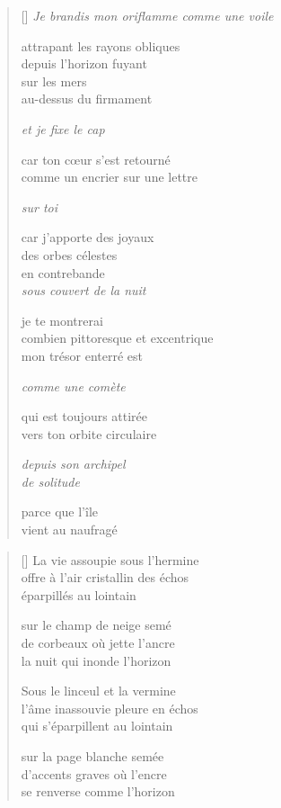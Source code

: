 \documentclass[12pt,a4paper]{article}
\begin{document}
\begin{verse}[\versewidth]
  \emph{Je brandis mon oriflamme comme une voile}

  attrapant les rayons obliques \\
  depuis l'horizon fuyant \\
  sur les mers \\
  au-dessus du firmament

  \emph{et je fixe le cap}

  car ton cœur s'est retourné \\
  comme un encrier sur une lettre

  \emph{sur toi}

  car j'apporte des joyaux \\
  des orbes célestes \\
  en contrebande \\

  \emph{sous couvert de la nuit}

  je te montrerai \\
  combien pittoresque et excentrique \\
  mon trésor enterré est

  \emph{comme une comète}

  qui est toujours attirée \\
  vers ton orbite circulaire

  \emph{depuis son archipel \\
  de solitude}

  parce que l'île \\
  vient au naufragé
\end{verse}


\newpage

\poemtitle{}

\settowidth{\versewidth}{offre à l'air cristallin des échos}

\bigskip\bigskip

\begin{verse}[\versewidth]
La vie assoupie sous l'hermine \\
offre à l'air cristallin des échos \\
éparpillés au lointain

sur le champ de neige semé \\
de corbeaux où jette l'ancre \\
la nuit qui inonde l'horizon

Sous le linceul et la vermine \\
l'âme inassouvie pleure en échos \\
qui s'éparpillent au lointain

sur la page blanche semée \\
d'accents graves où l'encre \\
se renverse comme l'horizon
\end{verse}
\end{document}
